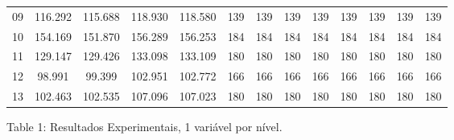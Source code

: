 \documentclass[12pt,a4paper]{article}
\begin{document}
\begin{adjustbox}{width={\textwidth}, totalheight={\textheight}, keepaspectratio}
\begin{tabular}{l cccc cccc cccc}
    09    & 116.292                                    & 115.688                         & 118.930                            & 118.580    & 139 & 139 & 139 & 139        & 139 & 139 & 139 & 139        \\
    10    & 154.169                                    & 151.870                         & 156.289                            & 156.253    & 184 & 184 & 184 & 184        & 184 & 184 & 184 & 184        \\
    11    & 129.147                                    & 129.426                         & 133.098                            & 133.109    & 180 & 180 & 180 & 180        & 180 & 180 & 180 & 180        \\
    12    & 98.991                                     & 99.399                          & 102.951                            & 102.772    & 166 & 166 & 166 & 166        & 166 & 166 & 166 & 166        \\
    13    & 102.463                                    & 102.535                         & 107.096                            & 107.023    & 180 & 180 & 180 & 180        & 180 & 180 & 180 & 180        \\
    \bottomrule
  \end{tabular}
\end{adjustbox}

\vspace*{0.2cm}

\begin{center}
  Table 1: Resultados Experimentais, 1 variável por nível.
\end{center}

\vspace*{0.5cm}
\end{document}
